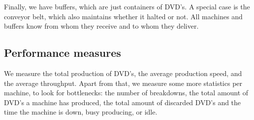 \documentclass{article}
\begin{document}
Finally, we have buffers, which are just containers of DVD's.
A special case is the conveyor belt, which also maintains whether it halted or not.
All machines and buffers know from whom they receive and to whom they deliver.

\subsection{Performance measures}
\label{performance_measures}
We measure the total production of DVD's, the average production speed,
and the average throughput.
Apart from that, we measure some more statistics per machine, to look for bottlenecks:
the number of breakdowns, the total amount of DVD's a machine has produced,
the total amount of discarded DVD's and the time the machine is down, busy producing, or idle.
\end{document}

